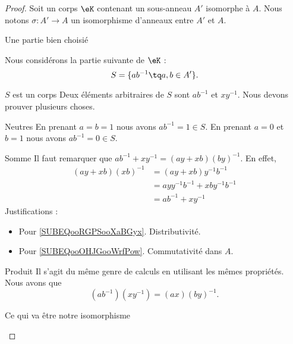 \begin{proof}
    Soit un corps \( \eK\) contenant un sous-anneau \( A'\) isomorphe à \( A\). Nous notons \( \sigma\colon A'\to A\) un isomorphisme d'anneaux entre \( A'\) et \( A\). 

    \begin{subproof}
    \item[Une partie bien choisié]

    Nous considérons la partie suivante de \( \eK\) :
    \begin{equation}
        S=\{ ab^{-1}\tq a,b\in A' \}.
    \end{equation}

\item[\( S\) est un corps]
Deux éléments arbitraires de \( S\) sont \( ab^{-1}\) et \( xy^{-1}\). Nous devons prouver plusieurs choses.
\begin{subproof}
\item[Neutres]
    En prenant \( a=b=1\) nous avons \( ab^{-1}=1\in S\). En prenant \( a=0\) et \( b=1\) nous avons \( ab^{-1}=0\in S\).
\item[Somme]
    Il faut remarquer que \( ab^{-1}+xy^{-1}=(ay+xb)(by)^{-1}\). En effet,
    \begin{subequations}
        \begin{align}
            (ay+xb)(xb)^{-1}&=(ay+xb)y^{-1}b^{-1}\\
            &=ayy^{-1}b^{-1}+xby^{-1}b^{-1}     \label{SUBEQooRGPSooXaBGyx}\\
            &=ab^{-1}+xy^{-1}       \label{SUBEQooOHJGooWrfPow}
        \end{align}
    \end{subequations}
    Justifications :
    \begin{itemize}
        \item Pour \eqref{SUBEQooRGPSooXaBGyx}. Distributivité.
        \item Pour \eqref{SUBEQooOHJGooWrfPow}. Commutativité dans \( A\).
    \end{itemize}
\item[Produit]
    Il s'agit du même genre de calculs en utilisant les mêmes propriétés. Nous avons que
    \begin{equation}
        (ab^{-1})(xy^{-1})=(ax)(by)^{-1}.
    \end{equation}
\end{subproof}

\item[Ce qui va être notre isomorphisme]



\end{subproof}
\end{proof}

